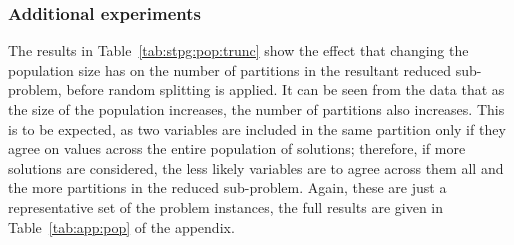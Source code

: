 \documentclass[journal]{IEEEtran}
\begin{document}
\subsubsection*{\textbf{Additional experiments}}

The results in Table~\ref{tab:stpg:pop:trunc} show the effect that changing the population size has on the number of partitions in the resultant reduced sub-problem, before random splitting is applied. It can be seen from the data that as the size of the population increases, the number of partitions also increases. This is to be expected, as two variables are included in the same partition only if they agree on values across the entire population of solutions; therefore, if more solutions are considered, the less likely variables are to agree across them all and the more partitions in the reduced sub-problem. Again, these are just a representative set of the problem instances, the full results are given in Table~\ref{tab:app:pop} of the appendix.
\end{document}
